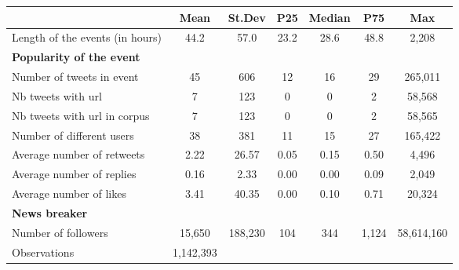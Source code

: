 {
\def\sym#1{\ifmmode^{#1}\else\(^{#1}\)\fi}
\begin{tabular}{l*{1}{cccccc}}
\hline\hline
                    &        Mean&      St.Dev&         P25&      Median&         P75&         Max\\
\hline
Length of the events (in hours)&        44.2&        57.0&        23.2&        28.6&        48.8&       2,208\\
\textbf{Popularity of the event}&            &            &            &            &            &            \\
Number of tweets in event&          45&         606&          12&          16&          29&     265,011\\
Nb tweets with url  &           7&         123&           0&           0&           2&      58,568\\
Nb tweets with url in corpus&           7&         123&           0&           0&           2&      58,565\\
Number of different users&          38&         381&          11&          15&          27&     165,422\\
Average number of retweets&        2.22&       26.57&        0.05&        0.15&        0.50&       4,496\\
Average number of replies&        0.16&        2.33&        0.00&        0.00&        0.09&       2,049\\
Average number of likes&        3.41&       40.35&        0.00&        0.10&        0.71&      20,324\\
\textbf{News breaker}        &            &            &            &            &            &            \\
Number of followers &      15,650&     188,230&         104&         344&       1,124&  58,614,160\\
\hline
Observations        &   1,142,393&            &            &            &            &            \\
\hline\hline
\end{tabular}
}
